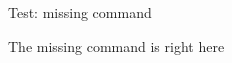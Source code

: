\documentclass{article}
\begin{document}
Test: missing command

The missing command is  right here
\end{document}
